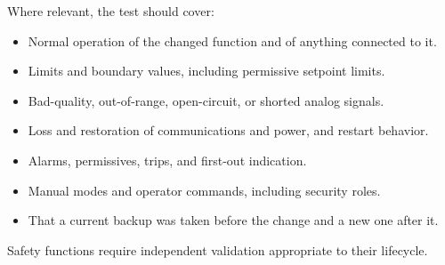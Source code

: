 Where relevant, the test should cover:
\begin{itemize}[itemsep=1pt]
  \item Normal operation of the changed function and of anything connected to it.
  \item Limits and boundary values, including permissive setpoint limits.
  \item Bad-quality, out-of-range, open-circuit, or shorted analog signals.
  \item Loss and restoration of communications and power, and restart behavior.
  \item Alarms, permissives, trips, and first-out indication.
  \item Manual modes and operator commands, including security roles.
  \item That a current backup was taken before the change and a new one after it.
\end{itemize}
Safety functions require independent validation appropriate to their lifecycle.
